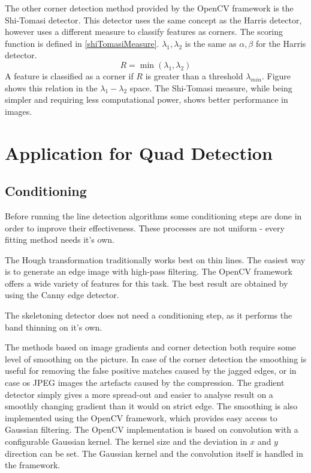 The other corner detection method provided by the OpenCV framework is the Shi-Tomasi detector\cite{Shi94goodfeatures}.
This detector uses the same concept as the Harris detector, however uses a different measure to classify features as corners.
The scoring function is defined in \eqref{shiTomasiMeasure}. $\lambda_1, \lambda_2$ is the same as $\alpha, \beta$ for the Harris detector.
\begin{equation}
	R = \min(\lambda_1, \lambda_2)
	\label{eq:shiTomasiMeasure}
\end{equation}
A feature is classified as a corner if $R$ is greater than a threshold $\lambda_{min}$.
Figure  shows this relation in the $\lambda_1-\lambda_2$ space.
The Shi-Tomasi measure, while being simpler and requiring less computational power, shows better performance in images\cite{Shi94goodfeatures}.

\section{Application for Quad Detection}

\subsection{Conditioning}

Before running the line detection algorithms some conditioning steps are done in order to improve their effectiveness.
These processes are not uniform - every fitting method needs it's own.

The Hough transformation traditionally works best on thin lines.
The easiest way is to generate an edge image with high-pass filtering.
The OpenCV framework offers a wide variety of features for this task.
The best result are obtained by using the Canny edge detector.

The skeletoning detector does not need a conditioning step, as it performs the band thinning on it's own.

The methods based on image gradients and corner detection both require some level of smoothing on the picture.
In case of the corner detection the smoothing is useful for removing the false positive matches caused by the jagged edges, or in case os JPEG images the artefacts caused by the compression.
The gradient detector simply gives a more spread-out and easier to analyse result on a smoothly changing gradient than it would on strict edge.
The smoothing is also implemented using the OpenCV framework, which provides easy access to Gaussian filtering.
The OpenCV implementation is based on convolution with a configurable Gaussian kernel.
The kernel size and the deviation in $x$ and $y$ direction can be set.
The Gaussian kernel and the convolution itself is handled in the framework.

